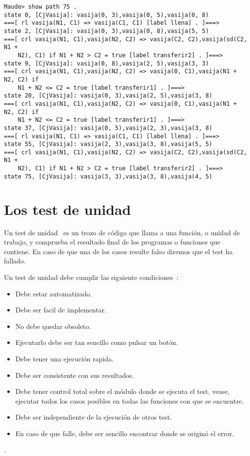 {\codesize
\begin{verbatim}
Maude> show path 75 .
state 0, [CjVasija]: vasija(0, 3),vasija(0, 5),vasija(0, 8)
===[ rl vasija(N1, C1) => vasija(C1, C1) [label llena] . ]===>
state 2, [CjVasija]: vasija(0, 3),vasija(0, 8),vasija(5, 5)
===[ crl vasija(N1, C1),vasija(N2, C2) => vasija(C2, C2),vasija(sd(C2, N1 +
    N2), C1) if N1 + N2 > C2 = true [label transferir2] . ]===>
state 9, [CjVasija]: vasija(0, 8),vasija(2, 5),vasija(3, 3)
===[ crl vasija(N1, C1),vasija(N2, C2) => vasija(0, C1),vasija(N1 + N2, C2) if
    N1 + N2 <= C2 = true [label transferir1] . ]===>
state 20, [CjVasija]: vasija(0, 3),vasija(2, 5),vasija(3, 8)
===[ crl vasija(N1, C1),vasija(N2, C2) => vasija(0, C1),vasija(N1 + N2, C2) if
    N1 + N2 <= C2 = true [label transferir1] . ]===>
state 37, [CjVasija]: vasija(0, 5),vasija(2, 3),vasija(3, 8)
===[ rl vasija(N1, C1) => vasija(C1, C1) [label llena] . ]===>
state 55, [CjVasija]: vasija(2, 3),vasija(3, 8),vasija(5, 5)
===[ crl vasija(N1, C1),vasija(N2, C2) => vasija(C2, C2),vasija(sd(C2, N1 +
    N2), C1) if N1 + N2 > C2 = true [label transferir2] . ]===>
state 75, [CjVasija]: vasija(3, 3),vasija(3, 8),vasija(4, 5)
\end{verbatim}
}

\section{Los test de unidad}

Un test de unidad~\cite{unitTests} es un trozo de código que llama a una función, o unidad de trabajo, y comprueba el resultado final de los programas o funciones que contiene. En caso de que una de los casos resulte falso diremos que el test ha fallado.\par

Un test de unidad debe cumplir las siguiente condiciones~\cite{unitTests}: \par

\begin{itemize}
\item Debe estar automatizado.
\item Debe ser facil de implementar.
\item No debe quedar obsoleto.
\item Ejecutarlo debe ser tan sencillo como pulsar un botón.
\item Debe tener una ejecución rapida.
\item Debe ser consistente con sus resultados. 
\item Debe tener control total sobre el módulo donde se ejecuta el test, vease, ejecutar todos los casos posibles en todas las funciones con que se encuentre.
\item Debe ser independiente de la ejecución de otros test.
\item En caso de que falle, debe ser sencillo encontrar donde se originó el error.
\end{itemize}.

